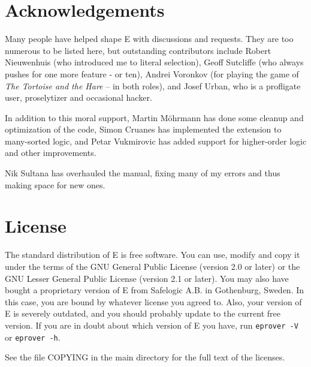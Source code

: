 \documentclass{report}
\begin{document}
\clearpage
\begin{appendix}
  \chapter{Acknowledgements}

   Many people have helped shape E with
  discussions and requests. They are too numerous to be listed here,
  but outstanding contributors include Robert Nieuwenhuis (who
  introduced me to literal selection), Geoff Sutcliffe (who always
  pushes for one more feature - or ten), Andrei Voronkov (for playing
  the game of \emph{The Tortoise and the Hare} -- in both roles), and
  Josef Urban, who is a profligate user, proselytizer and occasional
  hacker.

  In addition to this moral support, Martin M\"ohrmann has done some
  cleanup and optimization of the code, Simon Cruanes has implemented
  the extension to many-sorted logic, and Petar Vukmirovic has added
  support for higher-order logic and other improvements.

  Nik Sultana has overhauled the manual, fixing many of my errors and
  thus making space for new ones.

  \chapter{License}

   The standard distribution of E is free software. You
  can use, modify and copy it under the terms of the GNU General
  Public License (version 2.0 or later) or the GNU Lesser General
  Public License (version 2.1 or later). You may also have bought a
  proprietary version of E from Safelogic A.B. in Gothenburg,
  Sweden. In this case, you are bound by whatever license you agreed
  to. Also, your version of E is severely outdated, and you should
  probably update to the current free version. If you are in doubt
  about which version of E you have, run \texttt{eprover -V} or
  \texttt{eprover -h}.

  See the file COPYING in the main directory for the full text of the
  licenses.
\end{appendix}
\end{document}
